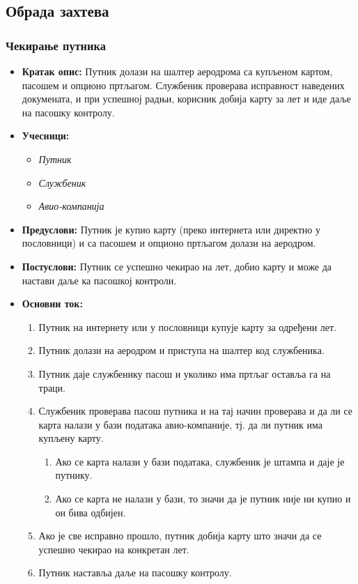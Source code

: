 \documentclass{article}
\begin{document}
\newpage
\subsection{Обрада захтева}

\subsubsection{Чекирање путника}

\begin{itemize}
    \item \textbf{Кратак опис:} Путник долази на шалтер аеродрома са купљеном картом, пасошем и опционо пртљагом. Службеник проверава исправност наведених докумената, и при успешној радњи, корисник добија карту за лет и иде даље на пасошку контролу.
    \item \textbf{Учесници:}
        \begin{itemize}
            \item \textit{Путник}
            \item \textit{Службеник}
            \item \textit{Авио-компанија}
        \end{itemize}
    \item \textbf{Предуслови:} Путник је купио карту (преко интернета или директно у пословници) и са пасошем и опционо пртљагом долази на аеродром.
    \item \textbf{Постуслови:} Путник се успешно чекирао на лет, добио карту и може да настави даље ка пасошкој контроли.
    \item \textbf{Основни ток:}
        \begin{enumerate}
            \item Путник на интернету или у пословници купује карту за одређени лет.
            \item Путник долази на аеродром и приступа на шалтер код службеника.
            \item Путник даје службенику пасош и уколико има пртљаг оставља га на траци.
            \item Службеник проверава пасош путника и на тај начин проверава и да ли се карта налази у бази података авио-компаније, тј. да ли путник има купљену карту.
                \begin{enumerate}
                    \item Ако се карта налази у бази података, службеник је штампа и даје је путнику.
                    \item Ако се карта не налази у бази, то значи да је путник није ни купио и он бива одбијен. 
                \end{enumerate}
            \item Ако је све исправно прошло, путник добија карту што значи да се успешно чекирао на конкретан лет.
            \item Путник наставља даље на пасошку контролу.
        \end{enumerate}
    

\end{itemize}
\end{document}
